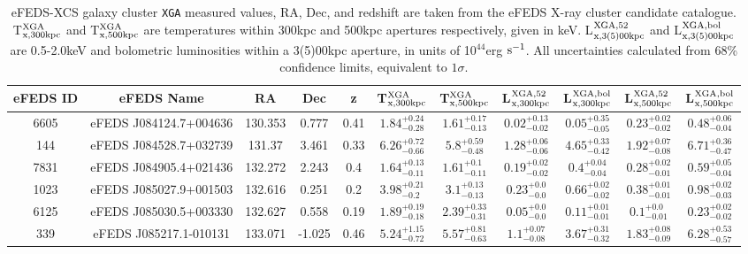 \documentclass[fleqn,usenatbib]{mnras}
\begin{document}
\begin{table}
\begin{center}
\caption[]{{eFEDS-XCS galaxy cluster \texttt{XGA} measured values, RA, Dec, and redshift are taken from the eFEDS X-ray cluster candidate catalogue. T$^{\rm{XGA}}_{\rm{x}, 300kpc}$ and T$^{\rm{XGA}}_{\rm{x}, 500kpc}$ are temperatures within 300kpc and 500kpc apertures respectively, given in keV. L$^{\rm{XGA, 52}}_{\rm{x, 3(5)00kpc}}$ and L$^{\rm{XGA, bol}}_{\rm{x, 3(5)00kpc}}$ are 0.5-2.0keV and bolometric luminosities within a 3(5)00kpc aperture, in units of 10$^{44}$erg $\rm{s}^{-1}$. All uncertainties calculated from 68\% confidence limits, equivalent to $1\sigma$.}\label{tab:measurements}}
\vspace{1mm}
\begin{tabular}{ccccccccccc}
\hline
\hline
eFEDS ID & eFEDS Name & RA & Dec & z & T$^{\rm{XGA}}_{\rm{x}, 300kpc}$ & T$^{\rm{XGA}}_{\rm{x}, 500kpc}$ & L$^{\rm{XGA, 52}}_{\rm{x, 300kpc}}$ & L$^{\rm{XGA, bol}}_{\rm{x, 300kpc}}$ & L$^{\rm{XGA, 52}}_{\rm{x, 500kpc}}$ & L$^{\rm{XGA, bol}}_{\rm{x, 500kpc}}$\\
\hline
\hline
6605 & eFEDS J084124.7+004636 & 130.353 & 0.777 & 0.41 & $1.84^{+0.24}_{-0.28}$ & $1.61^{+0.17}_{-0.13}$ & $0.02^{+0.13}_{-0.02}$ & $0.05^{+0.35}_{-0.05}$ & $0.23^{+0.02}_{-0.02}$ & $0.48^{+0.06}_{-0.04}$ \\ 
\hline
144 & eFEDS J084528.7+032739 & 131.37 & 3.461 & 0.33 & $6.26^{+0.72}_{-0.66}$ & $5.8^{+0.59}_{-0.48}$ & $1.28^{+0.06}_{-0.06}$ & $4.65^{+0.33}_{-0.42}$ & $1.92^{+0.07}_{-0.08}$ & $6.71^{+0.36}_{-0.47}$ \\ 
\hline
7831 & eFEDS J084905.4+021436 & 132.272 & 2.243 & 0.4 & $1.64^{+0.13}_{-0.11}$ & $1.61^{+0.1}_{-0.11}$ & $0.19^{+0.02}_{-0.02}$ & $0.4^{+0.04}_{-0.04}$ & $0.28^{+0.02}_{-0.01}$ & $0.59^{+0.05}_{-0.04}$ \\ 
\hline
1023 & eFEDS J085027.9+001503 & 132.616 & 0.251 & 0.2 & $3.98^{+0.21}_{-0.2}$ & $3.1^{+0.13}_{-0.13}$ & $0.23^{+0.0}_{-0.0}$ & $0.66^{+0.02}_{-0.02}$ & $0.38^{+0.01}_{-0.01}$ & $0.98^{+0.02}_{-0.03}$ \\ 
\hline
6125 & eFEDS J085030.5+003330 & 132.627 & 0.558 & 0.19 & $1.89^{+0.19}_{-0.18}$ & $2.39^{+0.33}_{-0.31}$ & $0.05^{+0.0}_{-0.0}$ & $0.11^{+0.01}_{-0.01}$ & $0.1^{+0.0}_{-0.01}$ & $0.23^{+0.02}_{-0.02}$ \\ 
\hline
339 & eFEDS J085217.1-010131 & 133.071 & -1.025 & 0.46 & $5.24^{+1.15}_{-0.72}$ & $5.57^{+0.81}_{-0.63}$ & $1.1^{+0.07}_{-0.08}$ & $3.67^{+0.31}_{-0.32}$ & $1.83^{+0.08}_{-0.09}$ & $6.28^{+0.53}_{-0.57}$ \\ 

\end{tabular}
\end{center}
\end{table}
\end{document}
